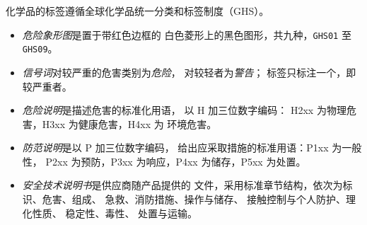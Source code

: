 \begin{definition}[GHS 标签]\label{def:b1:lab-techniques-1:ghs}
化学品的标签遵循全球化学品统一分类和标签制度（GHS）。
\begin{itemize}
  \item \emph{危险象形图}是置于带红色边框的
        白色菱形上的黑色图形，共九种，\texttt{GHS01}
        至\texttt{GHS09}。
  \item \emph{信号词}对较严重的危害类别为\emph{危险}，
        对较轻者为\emph{警告}；
        标签只标注一个，即较严重者。
  \item \emph{危险说明}是描述危害的标准化用语，
        以 H 加三位数字编码：
        H2xx 为物理危害，H3xx 为健康危害，H4xx 为
        环境危害。
  \item \emph{防范说明}是以 P 加三位数字编码，
        给出应采取措施的标准用语：P1xx 为一般性，
        P2xx 为预防，P3xx 为响应，P4xx 为储存，P5xx 为处置。
  \item \emph{安全技术说明书}是供应商随产品提供的
        文件，采用标准章节结构，依次为标识、危害、组成、
        急救、消防措施、操作与储存、
        接触控制与个人防护、理化性质、
        稳定性、毒性、
        处置与运输。
\end{itemize}
\end{definition}


